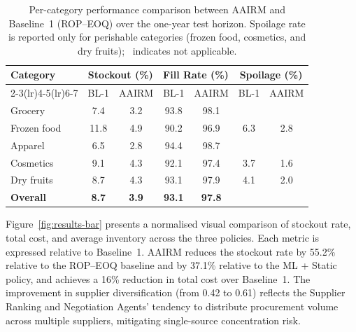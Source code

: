\documentclass[utf8]{FrontiersinHarvard}
\begin{document}
	\begin{table}[htbp]
		\centering
		\caption{Per-category performance comparison between AAIRM and
			Baseline~1 (ROP--EOQ) over the one-year test horizon.
			Spoilage rate is reported only for perishable categories (frozen
			food, cosmetics, and dry fruits); \textemdash~indicates not
			applicable.}
		\label{tab:results-category}
		\begin{tabular}{lcccccc}
			\toprule
			\multirow{2}{*}{\textbf{Category}}
			& \multicolumn{2}{c}{\textbf{Stockout (\%)}}
			& \multicolumn{2}{c}{\textbf{Fill Rate (\%)}}
			& \multicolumn{2}{c}{\textbf{Spoilage (\%)}} \\
			\cmidrule(lr){2-3}\cmidrule(lr){4-5}\cmidrule(lr){6-7}
			& BL-1 & AAIRM & BL-1 & AAIRM & BL-1 & AAIRM \\
			\midrule
			Grocery      & 7.4  & 3.2  & 93.8 & 98.1 & \textemdash & \textemdash \\
			Frozen food  & 11.8 & 4.9  & 90.2 & 96.9 & 6.3         & 2.8 \\
			Apparel      & 6.5  & 2.8  & 94.4 & 98.7 & \textemdash & \textemdash \\
			Cosmetics    & 9.1  & 4.3  & 92.1 & 97.4 & 3.7         & 1.6 \\
			Dry fruits   & 8.7  & 4.3  & 93.1 & 97.9 & 4.1         & 2.0 \\
			\midrule
			\textbf{Overall} & \textbf{8.7} & \textbf{3.9} &
			                   \textbf{93.1} & \textbf{97.8} & \textemdash & \textemdash \\
			\bottomrule
		\end{tabular}
	\end{table}

	Figure~\ref{fig:results-bar} presents a normalised visual comparison of
	stockout rate, total cost, and average inventory across the three policies.
	Each metric is expressed relative to Baseline~1.  AAIRM reduces the
	stockout rate by 55.2\% relative to the ROP--EOQ baseline and by 37.1\%
	relative to the ML + Static policy, and achieves a 16\% reduction in total
	cost over Baseline~1.  The improvement in supplier diversification (from
	0.42 to 0.61) reflects the Supplier Ranking and Negotiation Agents'
	tendency to distribute procurement volume across multiple suppliers,
	mitigating single-source concentration risk.
\end{document}

